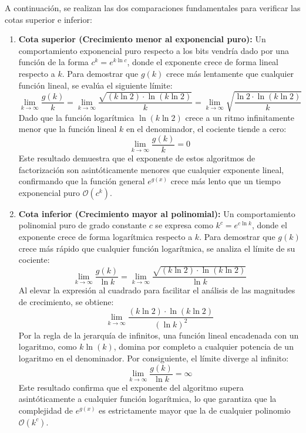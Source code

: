 \documentclass[11pt,a4paper,spanish]{book}
\begin{document}
A continuación, se realizan las dos comparaciones fundamentales para verificar las cotas superior e inferior:

\begin{enumerate}
    \item \textbf{Cota superior (Crecimiento menor al exponencial puro):}
    Un comportamiento exponencial puro respecto a los bits vendría dado por una función de la forma $c^k = e^{k \ln c}$, donde el exponente crece de forma lineal respecto a $k$. Para demostrar que $g(k)$ crece más lentamente que cualquier función lineal, se evalúa el siguiente límite:
    $$\lim_{k \to \infty} \frac{g(k)}{k} = \lim_{k \to \infty} \frac{\sqrt{(k \ln 2) \cdot \ln(k \ln 2)}}{k} = \lim_{k \to \infty} \sqrt{\frac{\ln 2 \cdot \ln(k \ln 2)}{k}}$$
    Dado que la función logarítmica $\ln(k \ln 2)$ crece a un ritmo infinitamente menor que la función lineal $k$ en el denominador, el cociente tiende a cero:
    $$\lim_{k \to \infty} \frac{g(k)}{k} = 0$$
        Este resultado demuestra que el exponente de estos algoritmos de factorización son asintóticamente menores que cualquier exponente lineal, confirmando que la función general $e^{g(x)}$ crece más lento que un tiempo exponencial puro $\mathcal{O}(c^k)$.

    \item \textbf{Cota inferior (Crecimiento mayor al polinomial):}
    Un comportamiento polinomial puro de grado constante $c$ se expresa como $k^c = e^{c \ln k}$, donde el exponente crece de forma logarítmica respecto a $k$. Para demostrar que $g(k)$ crece más rápido que cualquier función logarítmica, se analiza el límite de su cociente:
    $$\lim_{k \to \infty} \frac{g(k)}{\ln k} = \lim_{k \to \infty} \frac{\sqrt{(k \ln 2) \cdot \ln(k \ln 2)}}{\ln k}$$
    Al elevar la expresión al cuadrado para facilitar el análisis de las magnitudes de crecimiento, se obtiene:
    $$\lim_{k \to \infty} \frac{(k \ln 2) \cdot \ln(k \ln 2)}{(\ln k)^2}$$
    Por la regla de la jerarquía de infinitos, una función lineal encadenada con un logaritmo, como $k \ln(k)$, domina por completo a cualquier potencia de un logaritmo en el denominador. Por consiguiente, el límite diverge al infinito:
    $$\lim_{k \to \infty} \frac{g(k)}{\ln k} = \infty$$
        Este resultado confirma que el exponente del algoritmo supera asintóticamente a cualquier función logarítmica, lo que garantiza que la complejidad de $e^{g(x)}$ es estrictamente mayor que la de cualquier polinomio $\mathcal{O}(k^c)$.
\end{enumerate}
\end{document}
